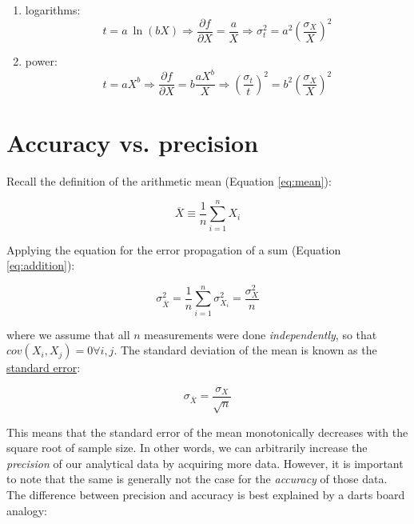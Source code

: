 \documentclass{book}
\begin{document}
\begin{enumerate}
\item{logarithms:}
\begin{equation}
t = a~\ln(bX) \Rightarrow \frac{\partial f}{\partial X} = \frac{a}{X}
\Rightarrow \sigma_t^2 = a^2 \left(\frac{\sigma_X}{X}\right)^2
\label{eq:logarithms}
\end{equation}

\item{power:}
\begin{equation}
  t = a X^b \Rightarrow \frac{\partial f}{\partial X} = b \frac{a
    X^b}{X} \Rightarrow \left(\frac{\sigma_t}{t}\right)^2 =
  b^2\left(\frac{\sigma_X}{X}\right)^2
\label{eq:power}
\end{equation}

\end{enumerate}

\section{Accuracy vs. precision}

Recall the definition of the arithmetic mean (Equation \ref{eq:mean}):

$$\overline{X} \equiv \frac{1}{n} \sum_{i=1}^{n} X_i$$

Applying the equation for the error propagation of a sum (Equation
\ref{eq:addition}):

\begin{equation}
\sigma_{\overline{X}}^2 = \frac{1}{n} \sum_{i=1}^{n} \sigma^2_{X_i} =
\frac{\sigma^2_X}{n}
\label{eq:varianceofthemean}
\end{equation}

where we assume that all $n$ measurements were done
\emph{independently}, so that $cov(X_i,X_j)=0 \forall i, j$.  The
standard deviation of the mean is known as the \underline{standard
  error}:

\begin{equation}
\sigma_{\overline{X}} = \frac{\sigma_X}{\sqrt{n}}
\label{eq:standarderror}
\end{equation}

This means that the standard error of the mean monotonically decreases
with the square root of sample size. In other words, we can
arbitrarily increase the \emph{precision} of our analytical data by
acquiring more data. However, it is important to note that the same is
generally not the case for the \emph{accuracy} of those data. The
difference between precision and accuracy is best explained by a darts
board analogy:\\
\end{document}
